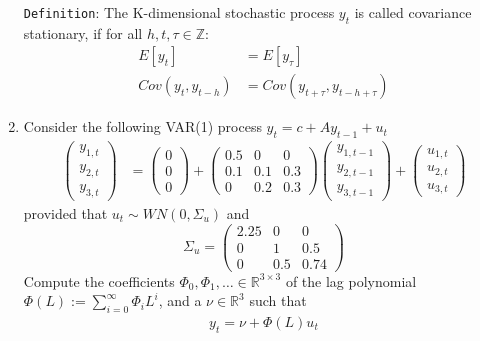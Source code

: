 \documentclass[a4paper]{scrartcl}
\begin{document}
\begin{enumerate}
\begin{solution}
                  \texttt{Definition}: The K-dimensional stochastic process $y_t$ is called covariance stationary, if for all $h,t,\tau \in \mathbb{Z}$:
                  \begin{align}
                      E[{y_t}]           & = E[{y_\tau}]                                  \\
                      Cov(y_{t},y_{t-h}) & = Cov(y_{t+\tau}, y_{t-h+\tau}) \label{gammas}
                  \end{align}
              \end{solution}
        \item Consider the following VAR(1) process $y_t = c + A y_{t-1} + u_t$
              \begin{align*}
                  \begin{pmatrix}y_{1,t} \\ y_{2,t}\\y_{3,t} \end{pmatrix} & = \begin{pmatrix}0\\0\\0 \end{pmatrix} + \begin{pmatrix}0.5 &0 &0 \\0.1&0.1&0.3\\0&0.2&0.3 \end{pmatrix} \begin{pmatrix}y_{1,{t-1}} \\ y_{2,{t-1}}\\y_{3,{t-1}} \end{pmatrix} + \begin{pmatrix}u_{1,t} \\ u_{2,t}\\ u_{3,t} \end{pmatrix}
              \end{align*}
              provided that $u_t \sim WN(0,\Sigma_u)$ and $$\Sigma_u = \begin{pmatrix}2.25 & 0 & 0\\ 0 & 1 & 0.5\\ 0 & 0.5 & 0.74 \end{pmatrix}$$
              Compute the coefficients $\Phi_0, \Phi_1, \dots \in \mathbb{R}^{3\times 3}$ of the lag polynomial $\Phi(L) := \sum_{i=0}^\infty \Phi_i L^i$, and a $\nu \in \mathbb{R}^3$ such that
              \begin{align*}
                  y_t = \nu + \Phi(L) u_t
              \end{align*}

\end{enumerate}
\end{document}

